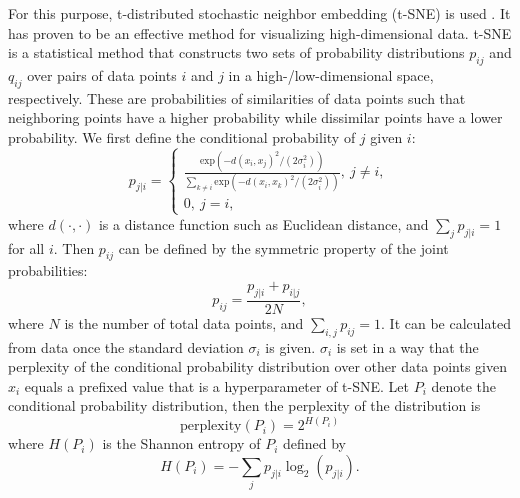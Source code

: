 \documentclass[11pt]{article}
\begin{document}
For this purpose, t-distributed stochastic neighbor embedding (t-SNE) is used \cite{van2008visualizing}. It has proven to be an effective method for visualizing high-dimensional data. t-SNE is a statistical method that constructs two sets of probability distributions $p_{ij}$ and $q_{ij}$ over pairs of data points $i$ and $j$ in a high-/low-dimensional space, respectively. These are probabilities of similarities of data points such that neighboring points have a higher probability while dissimilar points have a lower probability. We first define the conditional probability of $j$ given $i$:
\begin{equation}
    p_{j|i}=
    \begin{cases}\frac{\mathrm{exp}(-d(x_{i},x_{j})^{2}/(2\sigma_{i}^{2}))}{\sum\limits_{k \neq i}\mathrm{exp}(-d(x_{i},x_{k})^{2}/(2\sigma_{i}^{2}))}, \ j \neq i, \\
    0, \ j=i,
    \end{cases}
\end{equation}
where $d(\cdot,\cdot)$ is a distance function such as Euclidean distance, and $\sum\limits_{j} p_{j|i}=1$ for all $i$. Then $p_{ij}$ can be defined by the symmetric property of the joint probabilities:
\begin{equation}
    p_{ij} = \frac{p_{j|i} + p_{i|j}}{2N},
\end{equation}
where $N$ is the number of total data points, and $\sum\limits_{i,j}p_{ij}=1$. It can be calculated from data once the standard deviation $\sigma_{i}$ is given. $\sigma_{i}$ is set in a way that the perplexity of the conditional probability distribution over other data points given $x_{i}$ equals a prefixed value that is a hyperparameter of t-SNE. Let $P_{i}$ denote the conditional probability distribution, then the perplexity of the distribution is
\begin{equation}
    \mathrm{perplexity}(P_{i}) = 2^{H(P_{i})}
\end{equation}
where $H(P_{i})$ is the Shannon entropy of $P_{i}$ defined by
\begin{equation}
    H(P_{i}) = -\sum\limits_{j}p_{j|i}\log_{2}(p_{j|i}).
\end{equation}
\end{document}
